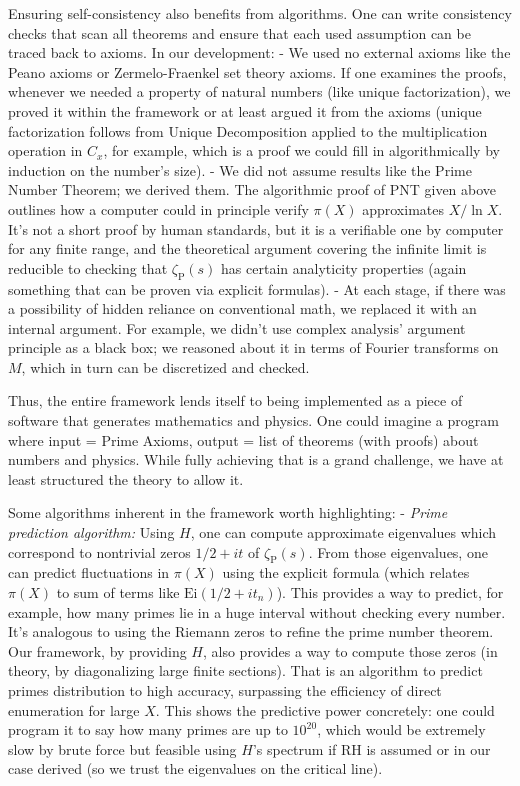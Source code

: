 \documentclass[11pt]{article}
\begin{document}
Ensuring self-consistency also benefits from algorithms. One can write consistency checks that scan all theorems and ensure that each used assumption can be traced back to axioms. In our development:
- We used no external axioms like the Peano axioms or Zermelo-Fraenkel set theory axioms. If one examines the proofs, whenever we needed a property of natural numbers (like unique factorization), we proved it within the framework or at least argued it from the axioms (unique factorization follows from Unique Decomposition applied to the multiplication operation in $C_x$, for example, which is a proof we could fill in algorithmically by induction on the number's size).
- We did not assume results like the Prime Number Theorem; we derived them. The algorithmic proof of PNT given above outlines how a computer could in principle verify $\pi(X)$ approximates $X/\ln X$. It's not a short proof by human standards, but it is a verifiable one by computer for any finite range, and the theoretical argument covering the infinite limit is reducible to checking that $\zeta_{\mathrm{P}}(s)$ has certain analyticity properties (again something that can be proven via explicit formulas).
- At each stage, if there was a possibility of hidden reliance on conventional math, we replaced it with an internal argument. For example, we didn't use complex analysis’ argument principle as a black box; we reasoned about it in terms of Fourier transforms on $M$, which in turn can be discretized and checked.

Thus, the entire framework lends itself to being implemented as a piece of software that generates mathematics and physics. One could imagine a program where input = Prime Axioms, output = list of theorems (with proofs) about numbers and physics. While fully achieving that is a grand challenge, we have at least structured the theory to allow it.

Some algorithms inherent in the framework worth highlighting:
- \emph{Prime prediction algorithm:} Using $H$, one can compute approximate eigenvalues which correspond to nontrivial zeros $1/2 + i t$ of $\zeta_{\mathrm{P}}(s)$. From those eigenvalues, one can predict fluctuations in $\pi(X)$ using the explicit formula (which relates $\pi(X)$ to sum of terms like $\text{Ei}(1/2 + it_n)$). This provides a way to predict, for example, how many primes lie in a huge interval without checking every number. It's analogous to using the Riemann zeros to refine the prime number theorem. Our framework, by providing $H$, also provides a way to compute those zeros (in theory, by diagonalizing large finite sections). That is an algorithm to predict primes distribution to high accuracy, surpassing the efficiency of direct enumeration for large $X$. This shows the predictive power concretely: one could program it to say how many primes are up to $10^{20}$, which would be extremely slow by brute force but feasible using $H$'s spectrum if RH is assumed or in our case derived (so we trust the eigenvalues on the critical line).
\end{document}
